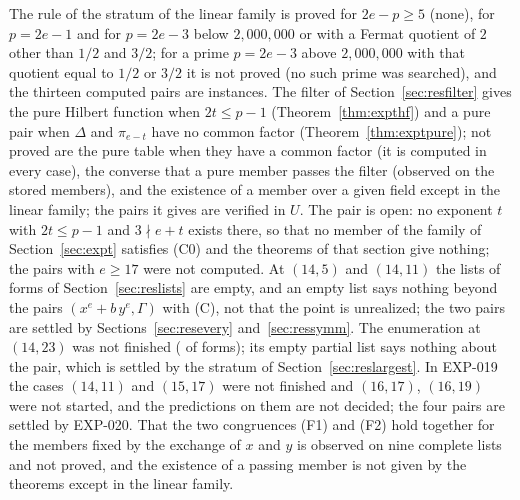 \documentclass[11pt]{article}
\theoremstyle{definition}
\theoremstyle{remark}
\newcommand{\EXP}[1]{\mbox{EXP-#1}}
\begin{document}
The rule of the stratum of the linear family is proved for $2e-p\ge5$ (none), for $p=2e-1$ and for $p=2e-3$ below $2{,}000{,}000$ or with a Fermat quotient of $2$ other than $1/2$ and $3/2$; for a prime $p=2e-3$ above $2{,}000{,}000$ with that quotient equal to $1/2$ or $3/2$ it is not proved (no such prime was searched), and the thirteen computed pairs are instances. The filter of Section~\ref{sec:resfilter} gives the pure Hilbert function when $2t\le p-1$ (Theorem~\ref{thm:expthf}) and a pure pair when $\Delta$ and $\pi_{e-t}$ have no common factor (Theorem~\ref{thm:exptpure}); not proved are the pure table when they have a common factor (it is computed in every case), the converse that a pure member passes the filter (observed on the stored members), and the existence of a member over a given field except in the linear family; the pairs it gives are verified in $U$. The pair \ngridOpenListSixteen{} is open: no exponent $t$ with $2t\le p-1$ and $3\nmid e+t$ exists there, so that no member of the family of Section~\ref{sec:expt} satisfies (C0) and the theorems of that section give nothing; the pairs with $e\ge17$ were not computed. At $(14,5)$ and $(14,11)$ the lists of forms of Section~\ref{sec:reslists} are empty, and an empty list says nothing beyond the pairs $(x^e+b\,y^e,\Gamma)$ with (C), not that the point is unrealized; the two pairs are settled by Sections~\ref{sec:resevery} and~\ref{sec:ressymm}. The enumeration at $(14,23)$ was not finished (\nlstNotFinishedDone{} of \nlstNotFinishedAll{} forms); its empty partial list says nothing about the pair, which is settled by the stratum of Section~\ref{sec:reslargest}. In \EXP{019} the cases $(14,11)$ and $(15,17)$ were not finished and $(16,17)$, $(16,19)$ were not started, and the predictions on them are not decided; the four pairs are settled by \EXP{020}. That the two congruences (F1) and (F2) hold together for the members fixed by the exchange of $x$ and $y$ is observed on nine complete lists and not proved, and the existence of a passing member is not given by the theorems except in the linear family.
\end{document}
